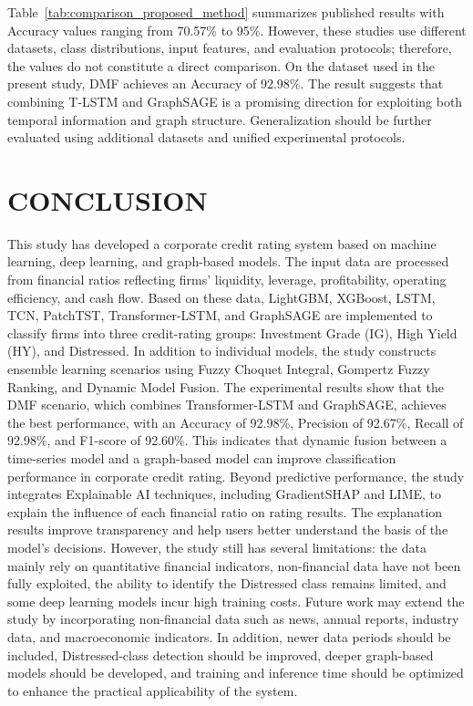 \documentclass[10pt,twoside]{article}
\begin{document}
Table~\ref{tab:comparison_proposed_method} summarizes published results with Accuracy values ranging from 70.57\% to 95\%. However, these studies use different datasets, class distributions, input features, and evaluation protocols; therefore, the values do not constitute a direct comparison. On the dataset used in the present study, DMF achieves an Accuracy of 92.98\%. The result suggests that combining T-LSTM and GraphSAGE is a promising direction for exploiting both temporal information and graph structure. Generalization should be further evaluated using additional datasets and unified experimental protocols.

\section{CONCLUSION}
This study has developed a corporate credit rating system based on machine learning, deep learning, and graph-based models. The input data are processed from financial ratios reflecting firms' liquidity, leverage, profitability, operating efficiency, and cash flow. Based on these data, LightGBM, XGBoost, LSTM, TCN, PatchTST, Transformer-LSTM, and GraphSAGE are implemented to classify firms into three credit-rating groups: Investment Grade (IG), High Yield (HY), and Distressed. In addition to individual models, the study constructs ensemble learning scenarios using Fuzzy Choquet Integral, Gompertz Fuzzy Ranking, and Dynamic Model Fusion. The experimental results show that the DMF scenario, which combines Transformer-LSTM and GraphSAGE, achieves the best performance, with an Accuracy of 92.98\%, Precision of 92.67\%, Recall of 92.98\%, and F1-score of 92.60\%. This indicates that dynamic fusion between a time-series model and a graph-based model can improve classification performance in corporate credit rating. Beyond predictive performance, the study integrates Explainable AI techniques, including GradientSHAP and LIME, to explain the influence of each financial ratio on rating results. The explanation results improve transparency and help users better understand the basis of the model's decisions. However, the study still has several limitations: the data mainly rely on quantitative financial indicators, non-financial data have not been fully exploited, the ability to identify the Distressed class remains limited, and some deep learning models incur high training costs. Future work may extend the study by incorporating non-financial data such as news, annual reports, industry data, and macroeconomic indicators. In addition, newer data periods should be included, Distressed-class detection should be improved, deeper graph-based models should be developed, and training and inference time should be optimized to enhance the practical applicability of the system.



\end{document}
